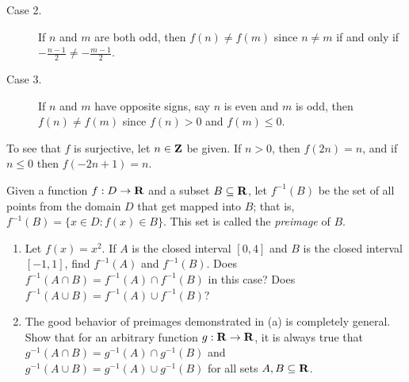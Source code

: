 \documentclass{lew98_solutions}
\begin{document}
\begin{solution}
\begin{enumerate}
\begin{description}
            \item[Case 2.] If \( n \) and \( m \) are both odd, then \( f(n) \neq f(m) \) since \( n \neq m \) if and only if \( -\tfrac{n-1}{2} \neq -\tfrac{m-1}{2} \).

            \item[Case 3.] If \( n \) and \( m \) have opposite signs, say \( n \) is even and \( m \) is odd, then \( f(n) \neq f(m) \) since \( f(n) > 0 \) and \( f(m) \leq 0 \).
        \end{description}
        To see that \( f \) is surjective, let \( n \in \mathbf{Z} \) be given. If \( n > 0 \), then \( f(2n) = n \), and if \( n \leq 0 \) then \( f(-2n + 1) = n \).
    \end{enumerate}
\end{solution}

\begin{exercise}
\label{ex:1.2.9}
    Given a function \( f : D \to \mathbf{R} \) and a subset \( B \subseteq \mathbf{R} \), let \( f^{-1}(B) \) be the set of all points from the domain \( D \) that get mapped into \( B \); that is, \( f^{-1}(B) = \{ x \in D : f(x) \in B \} \). This set is called the \textit{preimage} of \( B \).
    \begin{enumerate}
        \item Let \( f(x) = x^2 \). If \( A \) is the closed interval \( [0, 4] \) and \( B \) is the closed interval \( [-1, 1] \), find \( f^{-1}(A) \) and \( f^{-1}(B) \). Does \( f^{-1}(A \cap B) = f^{-1}(A) \cap f^{-1}(B) \) in this case? Does \( f^{-1}(A \cup B) = f^{-1}(A) \cup f^{-1}(B) \)?

        \item The good behavior of preimages demonstrated in (a) is completely general. Show that for an arbitrary function \( g : \mathbf{R} \to \mathbf{R} \), it is always true that \( g^{-1}(A \cap B) = g^{-1}(A) \cap g^{-1}(B) \) and \( g^{-1}(A \cup B) = g^{-1}(A) \cup g^{-1}(B) \) for all sets \( A, B \subseteq \mathbf{R} \).
    \end{enumerate}
\end{exercise}
\end{document}
